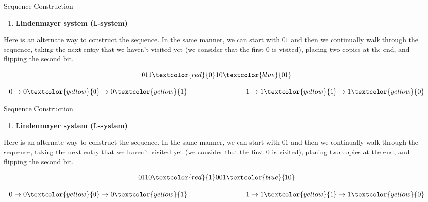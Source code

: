 \documentclass{beamer}
\begin{document}
\begin{frame}{Sequence Construction}
    \begin{enumerate}[2]
    \item \textbf{\large Lindenmayer system (L-system)}
    \end{enumerate}
    \vspace{0.5cm}
    Here is an alternate way to construct the sequence. In the same manner, we can start with $01$ and then we continually walk through the sequence, taking the next entry that we haven't visited yet (we consider that the first $0$ is visited), placing two copies at the end, and flipping the second bit. 

    \[
    011\textcolor{red}{0}10\textcolor{blue}{01}
    \]

    \[
        0 \rightarrow 0\textcolor{yellow}{0} \rightarrow 0\textcolor{yellow}{1} \hspace{3cm} 1 \rightarrow 1\textcolor{yellow}{1} \rightarrow 1\textcolor{yellow}{0}
    \]

\end{frame}

\begin{frame}{Sequence Construction}
    \begin{enumerate}[2]
    \item \textbf{\large Lindenmayer system (L-system)}
    \end{enumerate}
    \vspace{0.5cm}
    Here is an alternate way to construct the sequence. In the same manner, we can start with $01$ and then we continually walk through the sequence, taking the next entry that we haven't visited yet (we consider that the first $0$ is visited), placing two copies at the end, and flipping the second bit. 

    \[
    0110\textcolor{red}{1}001\textcolor{blue}{10}
    \]

    \[
        0 \rightarrow 0\textcolor{yellow}{0} \rightarrow 0\textcolor{yellow}{1} \hspace{3cm} 1 \rightarrow 1\textcolor{yellow}{1} \rightarrow 1\textcolor{yellow}{0}
    \]

\end{frame}
\end{document}
